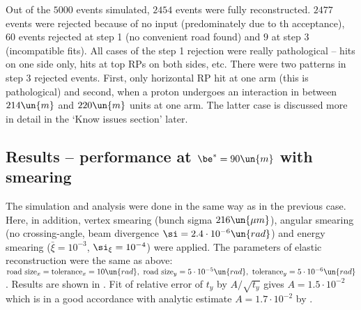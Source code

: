 

Out of the $5000$ events simulated, $2454$ events were fully reconstructed. $2477$ events were rejected because of no input (predominately due to th acceptance), $60$ events rejected at step 1 (no convenient road found) and $9$ at step 3 (incompatible fits). All cases of the step 1 rejection were really pathological -- hits on one side only, hits at top RPs on both sides, etc. There were two patterns in step 3 rejected events. First, only horizontal RP hit at one arm (this is pathological) and second, when a proton undergoes an interaction in between $214\un{m}$ and $220\un{m}$ units at one arm. The latter case is discussed more in detail in the `Know issues section' later.



\subsection{Results -- performance at $\be^* = 90\un{m}$ with smearing}

The simulation and analysis were done in the same way as in the previous case. Here, in addition, vertex smearing (bunch sigma $216\un{\mu m}$), angular smearing (no crossing-angle, beam divergence $\si = 2.4\cdot10^{-6}\un{rad}$) and energy smearing ($\bar\xi = 10^{-3}$, $\si_\xi = 10^{-4}$) were applied.
The parameters of elastic reconstruction were the same as above: ${\rm road\ size}_x = {\rm tolerance}_x = 10\un{rad},\ {\rm road\ size}_y = 5\cdot10^{-5}\un{rad},\ {\rm tolerance}_y = 5\cdot10^{-6}\un{rad}$. Results are shown in . Fit of relative error of $t_y$ by $A/\sqrt{t_y}$ gives $A = 1.5\cdot10^{-2}$ which is in a good accordance with analytic estimate $A = 1.7\cdot10^{-2}$ by .


